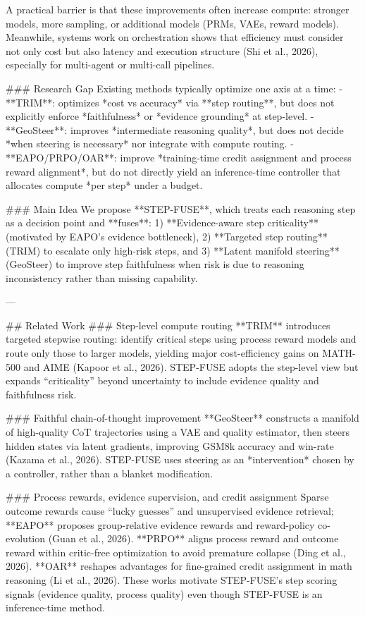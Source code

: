 A practical barrier is that these improvements often increase compute: stronger models, more sampling, or additional models (PRMs, VAEs, reward models). Meanwhile, systems work on orchestration shows that efficiency must consider not only cost but also latency and execution structure (Shi et al., 2026), especially for multi-agent or multi-call pipelines.

### Research Gap  
Existing methods typically optimize one axis at a time:  
- **TRIM**: optimizes *cost vs accuracy* via **step routing**, but does not explicitly enforce *faithfulness* or *evidence grounding* at step-level.  
- **GeoSteer**: improves *intermediate reasoning quality*, but does not decide *when steering is necessary* nor integrate with compute routing.  
- **EAPO/PRPO/OAR**: improve *training-time credit assignment and process reward alignment*, but do not directly yield an inference-time controller that allocates compute *per step* under a budget.  

### Main Idea  
We propose **STEP-FUSE**, which treats each reasoning step as a decision point and **fuses**:  
1) **Evidence-aware step criticality** (motivated by EAPO’s evidence bottleneck),  
2) **Targeted step routing** (TRIM) to escalate only high-risk steps, and  
3) **Latent manifold steering** (GeoSteer) to improve step faithfulness when risk is due to reasoning inconsistency rather than missing capability.  

---

## Related Work  
### Step-level compute routing  
**TRIM** introduces targeted stepwise routing: identify critical steps using process reward models and route only those to larger models, yielding major cost-efficiency gains on MATH-500 and AIME (Kapoor et al., 2026). STEP-FUSE adopts the step-level view but expands “criticality” beyond uncertainty to include evidence quality and faithfulness risk.

### Faithful chain-of-thought improvement  
**GeoSteer** constructs a manifold of high-quality CoT trajectories using a VAE and quality estimator, then steers hidden states via latent gradients, improving GSM8k accuracy and win-rate (Kazama et al., 2026). STEP-FUSE uses steering as an *intervention* chosen by a controller, rather than a blanket modification.

### Process rewards, evidence supervision, and credit assignment  
Sparse outcome rewards cause “lucky guesses” and unsupervised evidence retrieval; **EAPO** proposes group-relative evidence rewards and reward-policy co-evolution (Guan et al., 2026). **PRPO** aligns process reward and outcome reward within critic-free optimization to avoid premature collapse (Ding et al., 2026). **OAR** reshapes advantages for fine-grained credit assignment in math reasoning (Li et al., 2026). These works motivate STEP-FUSE’s step scoring signals (evidence quality, process quality) even though STEP-FUSE is an inference-time method.

